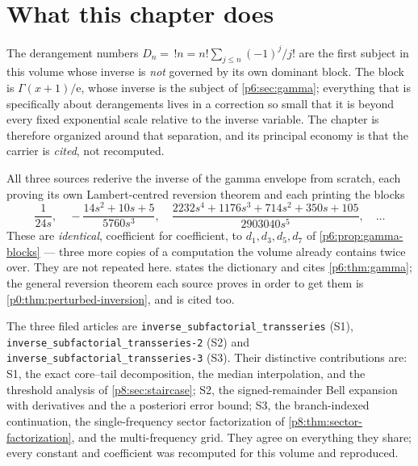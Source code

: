 \documentclass[11pt,a4paper,oneside]{book}
\theoremstyle{plain}
\theoremstyle{definition}
\theoremstyle{remark}
\newcommand{\e}{\mathrm{e}}
\begin{document}
\section{What this chapter does}
\label{p8:sec:intro}

The derangement numbers $D_n=\,!n=n!\sum_{j\le n}(-1)^{j}/j!$ are the first
subject in this volume whose inverse is \emph{not} governed by its own
dominant block.  The block is $\Gamma(x+1)/\e$, whose inverse is the subject
of \cref{p6:sec:gamma}; everything that is specifically about derangements
lives in a correction so small that it is beyond every fixed exponential
scale relative to the inverse variable.  The chapter is therefore organized
around that separation, and its principal economy is that the carrier is
\emph{cited}, not recomputed.

\begin{repairbox}
All three sources rederive the inverse of the gamma envelope from scratch,
each proving its own Lambert-centred reversion theorem and each printing the
blocks
\[
 \frac1{24s},\quad
 -\frac{14s^{2}+10s+5}{5760s^{3}},\quad
 \frac{2232s^{4}+1176s^{3}+714s^{2}+350s+105}{2903040s^{5}},\quad\dots
\]
These are \emph{identical}, coefficient for coefficient, to
$d_1,d_3,d_5,d_7$ of \cref{p6:prop:gamma-blocks} --- three more copies of a
computation the volume already contains twice over.  They are not repeated
here.   states the dictionary and cites
\cref{p6:thm:gamma}; the general reversion theorem each source proves in order
to get them is \cref{p0:thm:perturbed-inversion}, and is cited too.
\end{repairbox}

\begin{sourcebox}
The three filed articles are
\texttt{inverse\_\allowbreak subfactorial\_\allowbreak transseries} (S1),
\texttt{inverse\_\allowbreak subfactorial\_\allowbreak transseries-2} (S2) and
\texttt{inverse\_\allowbreak subfactorial\_\allowbreak transseries-3} (S3).  Their distinctive
contributions are: S1, the exact core--tail decomposition, the median
interpolation, and the threshold analysis of \cref{p8:sec:staircase}; S2, the
signed-remainder Bell expansion with derivatives and the a posteriori error
bound; S3, the branch-indexed continuation, the single-frequency sector
factorization of \cref{p8:thm:sector-factorization}, and the multi-frequency
grid.  They agree on everything they share; every constant and coefficient was
recomputed for this volume and reproduced.
\end{sourcebox}
\end{document}
